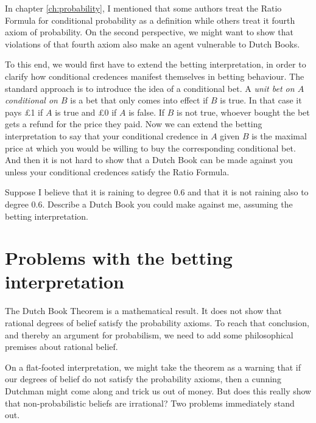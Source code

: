 In chapter \ref{ch:probability}, I mentioned that some authors treat
the Ratio Formula for conditional probability as a definition while
others treat it fourth axiom of probability. On the second
perspective, we might want to show that violations of that fourth
axiom also make an agent vulnerable to Dutch Books.

To this end, we would first have to extend the betting interpretation,
in order to clarify how conditional credences manifest themselves in
betting behaviour. The standard approach is to introduce the idea of a
conditional bet. A \emph{unit bet on $A$ conditional on $B$} is a bet
that only comes into effect if $B$ is true. In that case it pays £1 if
$A$ is true and £0 if $A$ is false. If $B$ is not true, whoever bought
the bet gets a refund for the price they paid. Now we can extend the
betting interpretation to say that your conditional credence in $A$
given $B$ is the maximal price at which you would be willing to buy the
corresponding conditional bet. And then it is not hard to show that a
Dutch Book can be made against you unless your conditional credences
satisfy the Ratio Formula.


\begin{exercise2}
  Suppose I believe that it is raining to degree 0.6 and that it is
  not raining also to degree 0.6. Describe a Dutch Book you could make
  against me, assuming the betting interpretation.
\end{exercise2}

\section{Problems with the betting interpretation}\label{sec:problem-betting}

The Dutch Book Theorem is a mathematical result. It does not show that
rational degrees of belief satisfy the probability axioms. To reach
that conclusion, and thereby an argument for probabilism, we need to
add some philosophical premises about rational belief.

On a flat-footed interpretation, we might take the theorem as a
warning that if our degrees of belief do not satisfy the probability
axioms, then a cunning Dutchman might come along and trick us out of
money. But does this really show that non-probabilistic beliefs are
irrational? Two problems immediately stand out.

